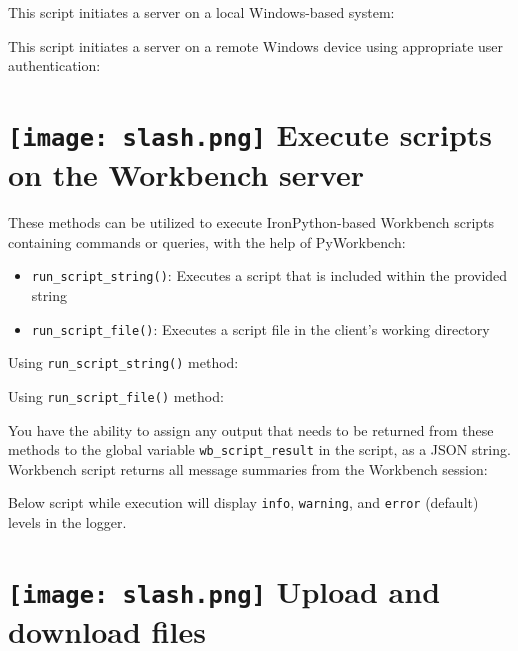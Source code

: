 \documentclass[9pt,landscape]{article}
\begin{document}
\begin{multicols}{3}
This script initiates a server on a local Windows-based system:

This script initiates a server on a remote Windows device using appropriate user authentication:

\section{\texttt{[image: slash.png]} Execute scripts on the Workbench server}

These methods can be utilized to execute IronPython-based Workbench scripts containing commands or queries, with the help of PyWorkbench:

\begin{itemize}
\item \texttt{run_script_string()}: Executes a script that is included within the provided string
\item \texttt{run_script_file()}: Executes a script file in the client's working directory
\end{itemize}    

Using \texttt{run_script_string()} method:

Using \texttt{run_script_file()} method:

You have the ability to assign any output that needs to be returned from these methods to the global variable \texttt{wb_script_result} in the script, as a JSON string.
Workbench script returns all message summaries from the Workbench session:

Below script while execution will display \texttt{info}, \texttt{warning}, and \texttt{error} (default) levels in the logger.


\vfill

\section{\texttt{[image: slash.png]} Upload and download files}


\end{multicols}
\end{document}
